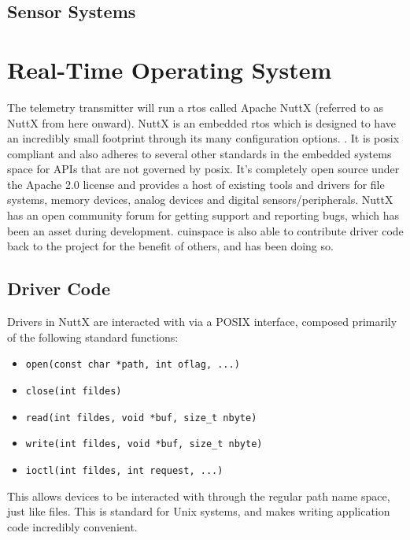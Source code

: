 \subsection{Sensor Systems}



\section{Real-Time Operating System}

The telemetry transmitter will run a \gls{rtos} called Apache NuttX (referred to as NuttX from here onward). NuttX is
an embedded \gls{rtos} which is designed to have an incredibly small footprint through its many configuration options.
\cite{nuttx-about}. It is \gls{posix} compliant and also adheres to several other standards in the embedded systems
space for APIs that are not governed by \gls{posix}. \cite{nuttx-about} It's completely open source under the Apache
2.0 license and provides a host of existing tools and drivers for file systems, memory devices, analog devices and
digital sensors/peripherals. NuttX has an open community forum for getting support and reporting bugs, which has been
an asset during development. \Gls{cuinspace} is also able to contribute driver code back to the project for the benefit
of others, and has been doing so.

\subsection{Driver Code}

Drivers in NuttX are interacted with via a POSIX interface, composed primarily of the following standard functions:

\begin{itemize}
    \item \texttt{open(const char *path, int oflag, ...)}
    \item \texttt{close(int fildes)}
    \item \texttt{read(int fildes, void *buf, size\_t nbyte)}
    \item \texttt{write(int fildes, void *buf, size\_t nbyte)}
    \item \texttt{ioctl(int fildes, int request, ...)}
\end{itemize}

This allows devices to be interacted with through the regular path name space, just like files. This is standard for
Unix systems, and makes writing application code incredibly convenient.

